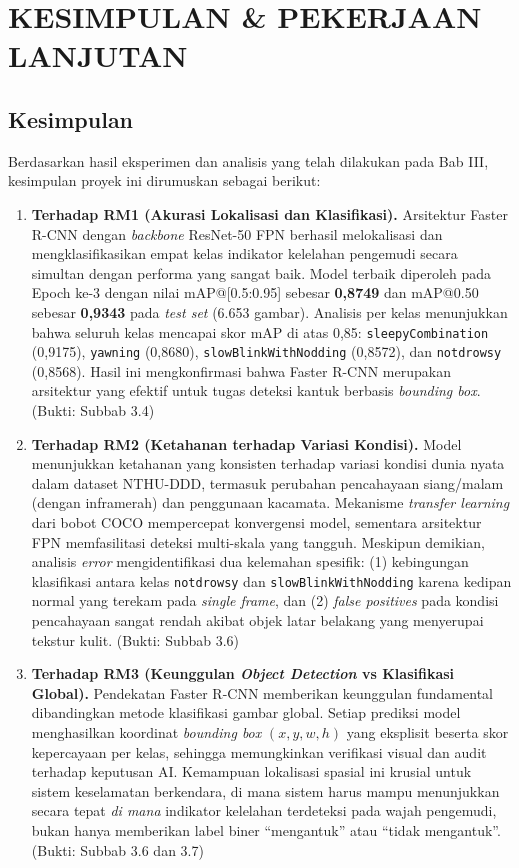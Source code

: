 \documentclass[11pt,a4paper,oneside]{report}
\begin{document}
\chapter{KESIMPULAN \& PEKERJAAN LANJUTAN}
\label{bab:kesimpulan}

\section{Kesimpulan}

Berdasarkan hasil eksperimen dan analisis yang telah dilakukan pada Bab III, kesimpulan proyek ini dirumuskan sebagai berikut:

\begin{enumerate}[leftmargin=*]
    \item \textbf{Terhadap RM1 (Akurasi Lokalisasi dan Klasifikasi).} Arsitektur Faster R-CNN dengan \textit{backbone} ResNet-50 FPN berhasil melokalisasi dan mengklasifikasikan empat kelas indikator kelelahan pengemudi secara simultan dengan performa yang sangat baik. Model terbaik diperoleh pada Epoch ke-3 dengan nilai mAP@[0.5:0.95] sebesar \textbf{0,8749} dan mAP@0.50 sebesar \textbf{0,9343} pada \textit{test set} (6.653 gambar). Analisis per kelas menunjukkan bahwa seluruh kelas mencapai skor mAP di atas 0,85: \texttt{sleepyCombination} (0,9175), \texttt{yawning} (0,8680), \texttt{slowBlinkWithNodding} (0,8572), dan \texttt{notdrowsy} (0,8568). Hasil ini mengkonfirmasi bahwa Faster R-CNN merupakan arsitektur yang efektif untuk tugas deteksi kantuk berbasis \textit{bounding box}. (Bukti: Subbab 3.4)

    \item \textbf{Terhadap RM2 (Ketahanan terhadap Variasi Kondisi).} Model menunjukkan ketahanan yang konsisten terhadap variasi kondisi dunia nyata dalam dataset NTHU-DDD, termasuk perubahan pencahayaan siang/malam (dengan inframerah) dan penggunaan kacamata. Mekanisme \textit{transfer learning} dari bobot COCO mempercepat konvergensi model, sementara arsitektur FPN memfasilitasi deteksi multi-skala yang tangguh. Meskipun demikian, analisis \textit{error} mengidentifikasi dua kelemahan spesifik: (1) kebingungan klasifikasi antara kelas \texttt{notdrowsy} dan \texttt{slowBlinkWithNodding} karena kedipan normal yang terekam pada \textit{single frame}, dan (2) \textit{false positives} pada kondisi pencahayaan sangat rendah akibat objek latar belakang yang menyerupai tekstur kulit. (Bukti: Subbab 3.6)

    \item \textbf{Terhadap RM3 (Keunggulan \textit{Object Detection} vs Klasifikasi Global).} Pendekatan Faster R-CNN memberikan keunggulan fundamental dibandingkan metode klasifikasi gambar global. Setiap prediksi model menghasilkan koordinat \textit{bounding box} $(x, y, w, h)$ yang eksplisit beserta skor kepercayaan per kelas, sehingga memungkinkan verifikasi visual dan audit terhadap keputusan AI. Kemampuan lokalisasi spasial ini krusial untuk sistem keselamatan berkendara, di mana sistem harus mampu menunjukkan secara tepat \textit{di mana} indikator kelelahan terdeteksi pada wajah pengemudi, bukan hanya memberikan label biner ``mengantuk'' atau ``tidak mengantuk''. (Bukti: Subbab 3.6 dan 3.7)
\end{enumerate}
\end{document}
